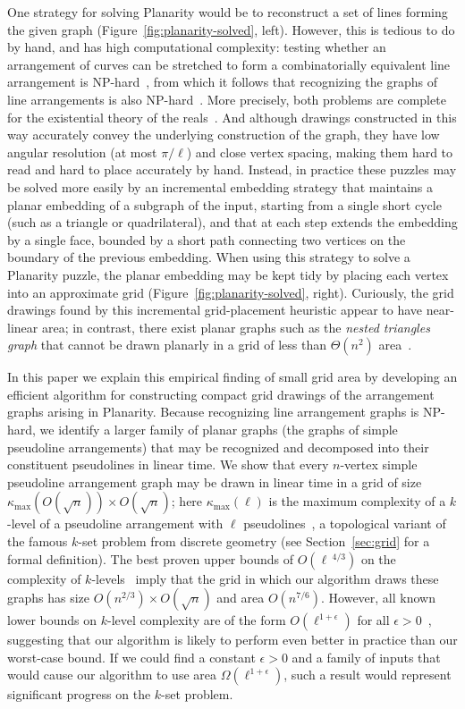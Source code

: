 \documentclass[oribibl]{llncs}
\newcommand{\maxklevel}{\kappa_{\max}}
\begin{document}
One strategy for solving Planarity would be to reconstruct a set of lines forming the given graph (Figure~\ref{fig:planarity-solved}, left). However, this is tedious to do by hand, and has high computational complexity: testing whether an arrangement of curves can be stretched to form a combinatorially equivalent line arrangement is NP-hard~\cite{Sho-VKF-91}, from which it follows that recognizing the graphs of line arrangements is also NP-hard~\cite{BosEveWis-IJCGA-03}. More precisely, both problems are complete for the existential theory of the reals~\cite{Sch-GD-09}. And although drawings constructed in this way accurately convey the underlying construction of the graph, they have low angular resolution (at most $\pi/\ell$) and close vertex spacing, making them hard to read and hard to place accurately by hand.
Instead, in practice these puzzles may be solved more easily by an incremental embedding strategy that maintains a planar embedding of a subgraph of the input, starting from a single short cycle (such as a triangle or quadrilateral), and that at each step extends the embedding by a single face, bounded by a short path connecting two  vertices on the boundary of the previous embedding. When using this strategy to solve a Planarity puzzle, the planar embedding may be kept tidy by placing each vertex into an approximate grid (Figure~\ref{fig:planarity-solved}, right). Curiously, the grid drawings found by this incremental grid-placement heuristic appear to have near-linear area; in contrast, there exist planar graphs such as the \emph{nested triangles graph} that cannot be drawn planarly in a grid of less than $\Theta(n^2)$ area~\cite{DolLeiTri-ACR-84,Val-TC-81}.

In this paper we explain this empirical finding of small grid area by developing an efficient algorithm for constructing compact grid drawings of the arrangement graphs arising in Planarity. Because recognizing line arrangement graphs is NP-hard, we identify a larger family of planar graphs (the graphs of simple pseudoline arrangements) that may be recognized and decomposed into their constituent pseudolines in linear time.  We show that every $n$-vertex simple pseudoline arrangement graph may be drawn in linear time in a grid of size $\maxklevel(O(\sqrt n))\times O(\sqrt n)$; here $\maxklevel(\ell)$ is
 the maximum complexity of a $k$-level of a pseudoline arrangement with $\ell$ pseudolines~\cite{KlaPatPip-82,TamTok-Algo-03,ShaSmo-WADS-03}, a topological variant of the famous $k$-set problem from discrete geometry (see Section~\ref{sec:grid} for a formal definition). The best proven upper bounds of $O(\ell\,^{4/3})$ on the complexity of $k$-levels~\cite{Dey-DCG-98,TamTok-Algo-03,ShaSmo-WADS-03} imply that the grid in which our algorithm draws these graphs has size $O(n^{2/3})\times O(\sqrt n)$ and area $O(n^{7/6})$. However, all known lower bounds on $k$-level complexity are of the form $O(\ell^{1+\epsilon})$ for all $\epsilon>0$~\cite{KlaPatPip-82,Tot-DCG-01}, suggesting that our algorithm is likely to perform even better in practice than our worst-case bound. If we could find a constant $\epsilon>0$ and a family of inputs that would cause our algorithm to use area $\Omega(\ell^{1+\epsilon})$, such a result would represent significant progress on the $k$-set problem.
\end{document}
